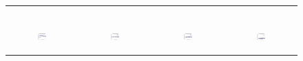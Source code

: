 \begin{figure}[ht]
\begin{tabular}{cccc}
\begin{subfigure}[b]{0.22\textwidth}
			\caption{}
			\label{appfig:partition:speedup_zigzag_setcover}
	  \end{subfigure} \\
	  \begin{subfigure}[b]{0.22\textwidth}
	  	\includegraphics[width=110pt]{images_partition/diffFA_CF2G_erdosrenyi_maxgraphcut.eps}
			\caption{}
			\label{appfig:partition:diffFA_CF2G_erdosrenyi_maxgraphcut}
	  \end{subfigure} &
	  \begin{subfigure}[b]{0.22\textwidth}
	  	\includegraphics[width=110pt]{images_partition/diffFA_CF2G_erdosrenyi_setcover.eps}
			\caption{}
			\label{appfig:partition:diffFA_CF2G_erdosrenyi_setcover}
	  \end{subfigure} &
	  \begin{subfigure}[b]{0.22\textwidth}
	  	\includegraphics[width=110pt]{images_partition/diffFA_CF2G_zigzag_maxgraphcut.eps}
			\caption{}
			\label{appfig:partition:diffFA_CF2G_zigzag_maxgraphcut}
	  \end{subfigure} &
	  \begin{subfigure}[b]{0.22\textwidth}
	  	\includegraphics[width=110pt]{images_partition/diffFA_CF2G_zigzag_setcover.eps}

\end{subfigure}
\end{tabular}
\end{figure}
